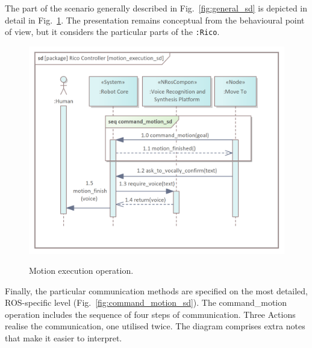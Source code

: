 \documentclass[11pt,oneside,a4paper]{report}
\begin{document}
		
	The part of the scenario generally described in Fig.~\ref{fig:general_sd} is depicted in detail in Fig.~\ref{fig:motion_execution_sd}. The presentation remains conceptual from the behavioural point of view, but it considers the particular parts of the \stSystem{} \texttt{:Rico}.
	
	\begin{figure}[H]
		\centering
		\begin{center}
			{\includegraphics[scale=1.1]{img/rico_pkg/motion_execution_sd.png}}
		\end{center}
		\caption{Motion execution operation.} 
		\label{fig:motion_execution_sd}
	\end{figure}


	Finally, the particular communication methods are specified on the most detailed, ROS-specific level (Fig.~\ref{fig:command_motion_sd}). The command\_motion operation includes the sequence of four steps of communication. Three Actions realise the communication, one utilised twice. The diagram comprises extra notes that make it easier to interpret.
	
\end{document}
